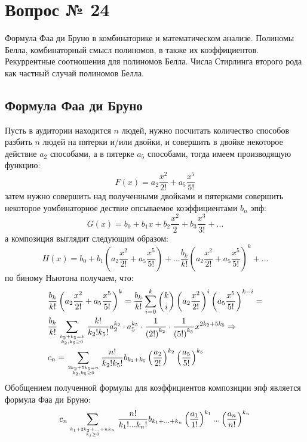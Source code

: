 \chapter{Вопрос № 24}

Формула Фаа ди Бруно в комбинаторике и математическом анализе. Полиномы Белла, комбинаторный смысл полиномов, в также их коэффициентов. Рекуррентные соотношения для полиномов Белла. Числа Стирлинга второго рода как частный случай полиномов Белла.

\section{Формула Фаа ди Бруно}

Пусть в аудитории находится $n$ людей, нужно посчитать количество способов разбить $n$ людей на пятерки и/или двойки, и совершить в двойке некоторое действие $a_2$ способами, а в пятерке $a_5$ способами, тогда имеем производящую функцию:
\[
	F\left(x\right) = a_2 \frac{x^2}{2!} + a_5 \frac{x^5}{5!}
\]
затем нужно совершить над полученными двойками и пятерками совершить некоторое уомбинаторное дествие опсываемое коэффициентами $b_n$ эпф:
\[
	G\left(x\right) = b_0 + b_1 x + b_2 \frac{x^2}{2} + b_3 \frac{x^3}{3!} + ...
\]
а композиция выглядит следующим образом:
\[
	H\left(x\right) = b_0 + b_1\left(a_2 \frac{x^2}{2!} + a_5\frac{x^5}{5!}\right) + ... \frac{b_k}{k!}\left(a_2\frac{x^2}{2!} + a_5\frac{x^5}{5!}\right)^k+...
\]
по биному Ньютона получаем, что:
\[
	\begin{split}
		& \frac{b_k}{k!}\left(a_2\frac{x^2}{2!}+a_5\frac{x^5}{5!}\right)^k = \frac{b_k}{k!} \sum_{i=0}^k \binom{k}{i} \left(a_2\frac{x^2}{2!}\right)^i\left(a_5\frac{x^5}{5!}\right)^{k-i} = \\
		& \frac{b_k}{k!}\sum_{{k_2+k_5=k}\atop{k_2,k_5\ge 0}} \frac{k!}{k_2!k_5!} a_2^{k_2}\cdot a_5^{k_5} \cdot \frac{1}{\left(2!\right)^{k_2}} \cdot \frac{1}{\left(5!\right)^{k_5}}x^{2k_2+5k_5} \Rightarrow \\
		& c_n = \sum_{{2k_2+5k_5=n}\atop{k_2,k_5\ge0}} \frac{n!}{k_2!k_5!} b_{k_2+k_5} \left(\frac{a_2}{2!}\right)^{k_2}\left(\frac{a_5}{5!}\right)^{k_5}
	\end{split}
\]
Обобщением полученной формулы для коэффициентов композиции эпф является формула Фаа ди Бруно:
\begin{equation}
	c_n \sum_{{k_1 + 2k_2 + ... + nk_n}\atop{k_i\ge0}} \frac{n!}{k_1!...k_n!} b_{k_1+...+k_n}\left(\frac{a_1}{1!}\right)^{k_1}...\left(\frac{a_n}{n!}\right)^{k_n}
\end{equation}
